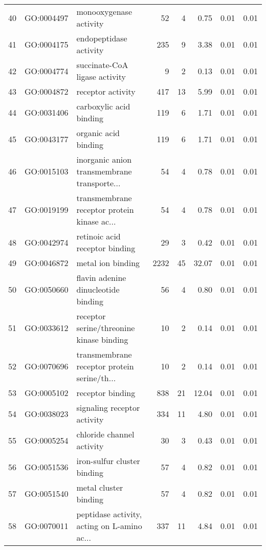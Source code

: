 \begin{table}[ht]
\begin{tabular}{rllrrrrr}
  40 & GO:0004497 & monooxygenase activity &  52 &   4 & 0.75 & 0.01 & 0.01 \\ 
  41 & GO:0004175 & endopeptidase activity & 235 &   9 & 3.38 & 0.01 & 0.01 \\ 
  42 & GO:0004774 & succinate-CoA ligase activity &   9 &   2 & 0.13 & 0.01 & 0.01 \\ 
  43 & GO:0004872 & receptor activity & 417 &  13 & 5.99 & 0.01 & 0.01 \\ 
  44 & GO:0031406 & carboxylic acid binding & 119 &   6 & 1.71 & 0.01 & 0.01 \\ 
  45 & GO:0043177 & organic acid binding & 119 &   6 & 1.71 & 0.01 & 0.01 \\ 
  46 & GO:0015103 & inorganic anion transmembrane transporte... &  54 &   4 & 0.78 & 0.01 & 0.01 \\ 
  47 & GO:0019199 & transmembrane receptor protein kinase ac... &  54 &   4 & 0.78 & 0.01 & 0.01 \\ 
  48 & GO:0042974 & retinoic acid receptor binding &  29 &   3 & 0.42 & 0.01 & 0.01 \\ 
  49 & GO:0046872 & metal ion binding & 2232 &  45 & 32.07 & 0.01 & 0.01 \\ 
  50 & GO:0050660 & flavin adenine dinucleotide binding &  56 &   4 & 0.80 & 0.01 & 0.01 \\ 
  51 & GO:0033612 & receptor serine/threonine kinase binding &  10 &   2 & 0.14 & 0.01 & 0.01 \\ 
  52 & GO:0070696 & transmembrane receptor protein serine/th... &  10 &   2 & 0.14 & 0.01 & 0.01 \\ 
  53 & GO:0005102 & receptor binding & 838 &  21 & 12.04 & 0.01 & 0.01 \\ 
  54 & GO:0038023 & signaling receptor activity & 334 &  11 & 4.80 & 0.01 & 0.01 \\ 
  55 & GO:0005254 & chloride channel activity &  30 &   3 & 0.43 & 0.01 & 0.01 \\ 
  56 & GO:0051536 & iron-sulfur cluster binding &  57 &   4 & 0.82 & 0.01 & 0.01 \\ 
  57 & GO:0051540 & metal cluster binding &  57 &   4 & 0.82 & 0.01 & 0.01 \\ 
  58 & GO:0070011 & peptidase activity, acting on L-amino ac... & 337 &  11 & 4.84 & 0.01 & 0.01 \\ 
   \hline
\end{tabular}
\end{table}
